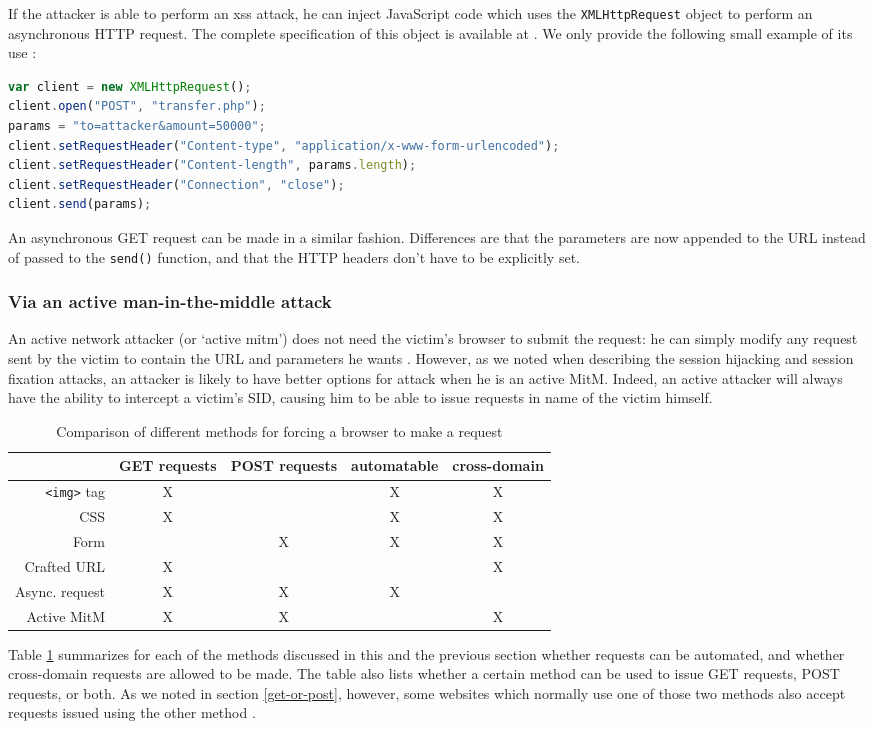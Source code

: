 If the attacker is able to perform an \gls{xss} attack, he can inject JavaScript code which uses the \texttt{XMLHttpRequest} object to perform an asynchronous HTTP request. The complete specification of this object is available at \cite{Kesteren:09:X}. We only provide the following small example of its use \cite{Binny2010}:
\begin{lstlisting}[language=JavaScript,breaklines=true]
var client = new XMLHttpRequest();
client.open("POST", "transfer.php");
params = "to=attacker&amount=50000";
client.setRequestHeader("Content-type", "application/x-www-form-urlencoded");
client.setRequestHeader("Content-length", params.length);
client.setRequestHeader("Connection", "close");
client.send(params);
\end{lstlisting}
An asynchronous GET request can be made in a similar fashion. Differences are that the parameters are now appended to the URL instead of passed to the \texttt{send()} function, and that the HTTP headers don't have to be explicitly set.

\subsubsection{Via an active man-in-the-middle attack}

An active network attacker (or `active \gls{mitm}') does not need the victim's browser to submit the request: he can simply modify any request sent by the victim to contain the URL and parameters he wants \cite{Barth2008}. However, as we noted when describing the session hijacking and session fixation attacks, an attacker is likely to have better options for attack when he is an active MitM. Indeed, an active attacker will always have the ability to intercept a victim's SID, causing him to be able to issue requests in name of the victim himself. 

\begin{table}[htb]
	\centering
	\begin{tabular}{r|cccc}
		& GET requests & POST requests & automatable & cross-domain\\
		\hline
		\texttt{<img>} tag & X & & X & X\\
		CSS & X & & X & X\\
		Form &  & X & X & X\\
		Crafted URL & X & & & X\\
		Async. request & X & X & X &\\
		Active MitM & X & X & & X
	\end{tabular}
	\caption{Comparison of different methods for forcing a browser to make a request}
	\label{tab:forcing-request}
\end{table}

Table \ref{tab:forcing-request} summarizes for each of the methods discussed in this and the previous section whether requests can be automated, and whether cross-domain requests are allowed to be made. The table also lists whether a certain method can be used to issue GET requests, POST requests, or both. As we noted in section \ref{get-or-post}, however, some websites which normally use one of those two methods also accept requests issued using the other method \cite{Zeller2008}.
